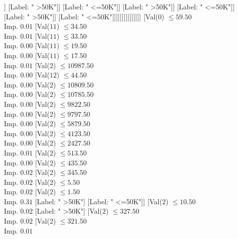 \documentclass[margin=10pt]{standalone}
\begin{document}
\begin{forest}
																								[Val($2$) $ \leq 16963.50$ \\ Imp. $0.25$
																									[Label: " >50K"]
																									[Label: " <=50K"]]
																								[Label: " >50K"]]
																							[Label: " <=50K"]]
																						[Label: " >50K"]]
																					[Label: " <=50K"]]
																				[Label: " >50K"]]
																			[Label: " <=50K"]]]]]]]]]]]]]]]
					[Val($0$) $ \leq 59.50$ \\ Imp. $0.01$
						[Val($11$) $ \leq 34.50$ \\ Imp. $0.01$
							[Val($11$) $ \leq 33.50$ \\ Imp. $0.00$
								[Val($11$) $ \leq 19.50$ \\ Imp. $0.00$
									[Val($11$) $ \leq 17.50$ \\ Imp. $0.01$
										[Val($2$) $ \leq 10987.50$ \\ Imp. $0.00$
											[Val($12$) $ \leq 44.50$ \\ Imp. $0.00$
												[Val($2$) $ \leq 10809.50$ \\ Imp. $0.00$
													[Val($2$) $ \leq 10785.50$ \\ Imp. $0.00$
														[Val($2$) $ \leq 9822.50$ \\ Imp. $0.00$
															[Val($2$) $ \leq 9797.50$ \\ Imp. $0.00$
																[Val($2$) $ \leq 5879.50$ \\ Imp. $0.00$
																	[Val($2$) $ \leq 4123.50$ \\ Imp. $0.00$
																		[Val($2$) $ \leq 2427.50$ \\ Imp. $0.01$
																			[Val($2$) $ \leq 513.50$ \\ Imp. $0.00$
																				[Val($2$) $ \leq 435.50$ \\ Imp. $0.02$
																					[Val($2$) $ \leq 345.50$ \\ Imp. $0.02$
																						[Val($2$) $ \leq 5.50$ \\ Imp. $0.02$
																							[Val($2$) $ \leq 1.50$ \\ Imp. $0.31$
																								[Label: " >50K"]
																								[Label: " <=50K"]]
																							[Val($2$) $ \leq 10.50$ \\ Imp. $0.02$
																								[Label: " >50K"]
																								[Val($2$) $ \leq 327.50$ \\ Imp. $0.02$
																									[Val($2$) $ \leq 321.50$ \\ Imp. $0.01$

\end{forest}
\end{document}
